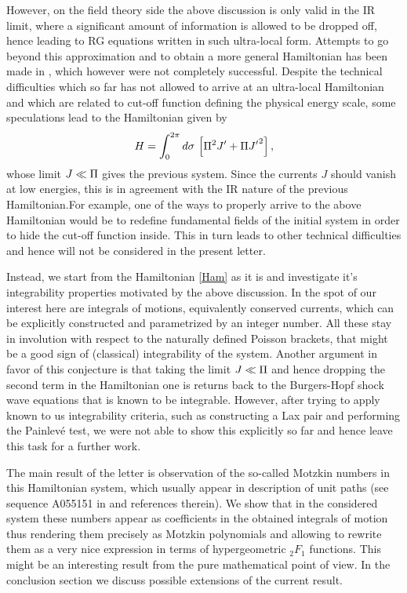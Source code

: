 \documentclass[12pt]{article}%
\numberwithin{equation}{section}
\begin{document}
However, on the field theory side the above discussion is only valid in the IR limit, where a significant amount of information is allowed to be dropped off, hence leading to RG equations written in such ultra-local form. Attempts to go beyond this approximation and to obtain a more general Hamiltonian has been made in \cite{Akhmedov:2010sw}, which however were not completely successful. Despite the technical difficulties which so far has not allowed to arrive at an ultra-local Hamiltonian and which are related to cut-off function defining the physical energy scale, some speculations lead to the Hamiltonian given by
\begin{equation} \label{Ham}
H=\int_0^{2\p} d\s\,\left[\P^2J'+\P{J'}^2\right],
\end{equation}
whose limit $J \ll \P$ gives the previous system. Since the currents $J$ should vanish at low energies, this is in agreement with the IR nature of the previous Hamiltonian.For example, one of the ways to properly arrive to the above Hamiltonian would be to redefine fundamental fields of the initial system in order to hide the cut-off function inside. This in turn leads to other technical difficulties and hence will not be considered in the present letter. 

Instead, we start from the Hamiltonian \eqref{Ham} as it is and investigate it's integrability properties motivated by the above discussion. In the spot of our interest here are integrals of motions, equivalently conserved currents, which can be explicitly constructed and parametrized by an integer number. All these stay in involution with respect to the naturally defined Poisson brackets, that might be a good sign of (classical) integrability of the system. Another argument in favor of this conjecture is that taking the limit $J \ll \P$ and hence dropping the second term in the Hamiltonian one is returns back to the Burgers-Hopf shock wave equations that is known to be integrable. However, after trying to apply known to us integrability criteria, such as constructing a Lax pair and performing the Painlev\'e test, we were not able to show this explicitly so far and hence leave this task for a further work. 

The main result of the letter is observation of the so-called Motzkin numbers in this Hamiltonian system, which usually appear  in description of unit paths (see sequence A055151 in \cite{Sloane} and references therein). We show that in the considered system these numbers appear as coefficients in the obtained integrals of motion thus rendering them precisely as Motzkin polynomials and allowing to rewrite them as a very nice expression in terms of hypergeometric ${}_2F_1$ functions. This might be an interesting result from the pure mathematical point of view. In the conclusion section we discuss possible extensions of the current result.
\end{document}
